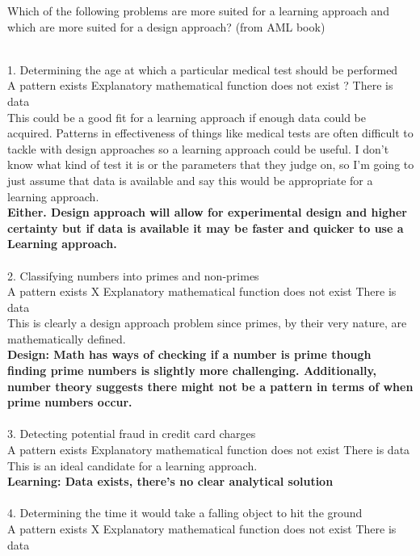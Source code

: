 \documentclass[draft]{exam} %
\theoremstyle{definition} \newtheorem*{defn}{Definition}
\begin{document}
\begin{questions}
\question Which of the following problems are more suited for a learning approach and which are more suited for
a design approach? (from AML book)\\
\begin{solution} \\%
1. Determining the age at which a particular medical test should be performed\\
 \checkmark A pattern exists \qquad  \checkmark Explanatory mathematical function does not exist \qquad ? There is data\\
This could be a good fit for a learning approach if enough data could be acquired.  Patterns in effectiveness of things like medical tests are often difficult to tackle with design approaches so a learning approach could be useful.  I don't know what kind of test it is or the parameters that they judge on, so I'm going to just assume that data is available and say this would be appropriate for a learning approach.\\
\textbf{Either. Design approach will allow for experimental design and higher certainty but if data is
available it may be faster and quicker to use a Learning approach.}
\\\\
2. Classifying numbers into primes and non-primes\\
 \checkmark A pattern exists \qquad  X Explanatory mathematical function does not exist \qquad  \checkmark There is data\\
This is clearly a design approach problem since primes, by their very nature, are mathematically defined.\\
\textbf{Design: Math has ways of checking if a number is prime though finding prime numbers is
slightly more challenging. Additionally, number theory suggests there might not be a pattern
in terms of when prime numbers occur.}
\\\\
3. Detecting potential fraud in credit card charges\\
 \checkmark A pattern exists \qquad  \checkmark Explanatory mathematical function does not exist \qquad  \checkmark There is data
This is an ideal candidate for a learning approach.\\
\textbf{Learning: Data exists, there's no clear analytical solution}
\\\\
4. Determining the time it would take a falling object to hit the ground\\
 \checkmark A pattern exists \qquad  X Explanatory mathematical function does not exist \qquad  \checkmark There is data\\

\end{solution}
\end{questions}
\end{document}
